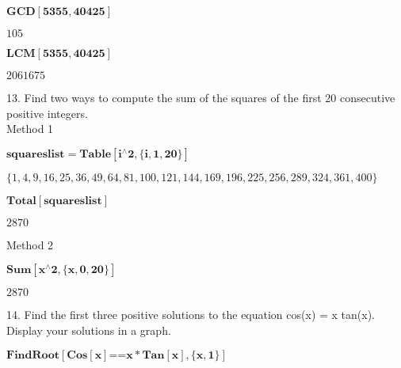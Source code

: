\documentclass{article}
\begin{document}
\begin{doublespace}
\noindent\(\pmb{\text{GCD}[5355,40425]}\)
\end{doublespace}

\begin{doublespace}
\noindent\(105\)
\end{doublespace}

\begin{doublespace}
\noindent\(\pmb{\text{LCM}[5355,40425]}\)
\end{doublespace}

\begin{doublespace}
\noindent\(2061675\)
\end{doublespace}

13. Find two ways to compute the sum of the squares of the first 20 consecutive positive integers.\\


Method 1

\begin{doublespace}
\noindent\(\pmb{\text{squareslist}=\text{Table}[i{}^{\wedge}2,\{i,1,20\}]}\)
\end{doublespace}

\begin{doublespace}
\noindent\(\{1,4,9,16,25,36,49,64,81,100,121,144,169,196,225,256,289,324,361,400\}\)
\end{doublespace}

\begin{doublespace}
\noindent\(\pmb{\text{Total}[\text{squareslist}]}\)
\end{doublespace}

\begin{doublespace}
\noindent\(2870\)
\end{doublespace}

Method 2

\begin{doublespace}
\noindent\(\pmb{\text{Sum}[x{}^{\wedge}2,\{x,0,20\}]}\)
\end{doublespace}

\begin{doublespace}
\noindent\(2870\)
\end{doublespace}

14. Find the first three positive solutions to the equation cos(x) = x tan(x). Display your solutions in a graph.\\


\begin{doublespace}
\noindent\(\pmb{\text{FindRoot}[\text{Cos}[x]\text{==}x*\text{Tan}[x],\{x,1\}]}\)
\end{doublespace}
\end{document}
